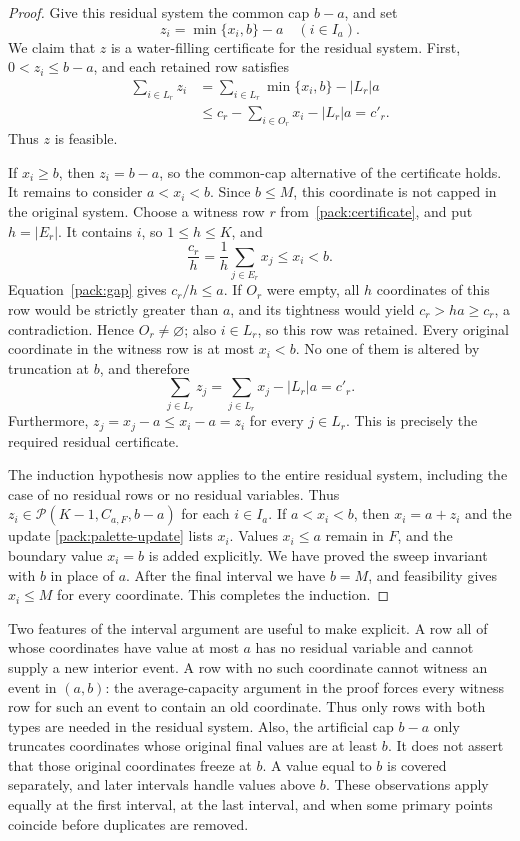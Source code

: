 \documentclass[11pt,a4paper]{article}
\theoremstyle{definition}
\theoremstyle{remark}
\begin{document}
\begin{proof}
Give this residual system the common cap $b-a$, and set
\begin{equation}\label{pack:residual-vector}
 z_i=\min\{x_i,b\}-a\quad(i\in I_a).
\end{equation}
We claim that $z$ is a water-filling certificate for the residual
system.  First, $0<z_i\leq b-a$, and each retained row satisfies
\begin{align*}
 \sum_{i\in L_r}z_i
 &=\sum_{i\in L_r}\min\{x_i,b\}-|L_r|a\\
 &\leq c_r-\sum_{i\in O_r}x_i-|L_r|a
 =c'_r.
\end{align*}
Thus $z$ is feasible.

If $x_i\geq b$, then $z_i=b-a$, so the common-cap alternative of
the certificate holds.  It remains to consider $a<x_i<b$.  Since
$b\leq M$, this coordinate is not capped in the original system.
Choose a witness row $r$ from~\eqref{pack:certificate}, and put
$h=|E_r|$.  It contains $i$, so $1\leq h\leq K$, and
\[
 \frac{c_r}{h}
 =\frac{1}{h}\sum_{j\in E_r}x_j
 \leq x_i<b.
\]
Equation~\eqref{pack:gap} gives $c_r/h\leq a$.
If $O_r$ were empty, all $h$ coordinates of this row would be strictly
greater than $a$, and its tightness would yield
$c_r>ha\geq c_r$, a contradiction.  Hence $O_r\ne\varnothing$;
also $i\in L_r$, so this row was retained.
Every original coordinate in the witness row is at most $x_i<b$.
No one of them is altered by truncation at $b$, and therefore
\[
 \sum_{j\in L_r}z_j
 =\sum_{j\in L_r}x_j-|L_r|a=c'_r.
\]
Furthermore, $z_j=x_j-a\leq x_i-a=z_i$ for every $j\in L_r$.
This is precisely the required residual certificate.

The induction hypothesis now applies to the entire residual system,
including the case of no residual rows or no residual variables.  Thus
$z_i\in\mathcal P(K-1,C_{a,F},b-a)$ for each $i\in I_a$.
If $a<x_i<b$, then $x_i=a+z_i$ and the update
\eqref{pack:palette-update} lists $x_i$.  Values $x_i\leq a$ remain in
$F$, and the boundary value $x_i=b$ is added explicitly.  We have proved
the sweep invariant with $b$ in place of $a$.  After the final interval
we have $b=M$, and feasibility gives $x_i\leq M$ for every coordinate.
This completes the induction.
\end{proof}

Two features of the interval argument are useful to make explicit.
A row all of whose coordinates have value at most $a$ has no residual
variable and cannot supply a new interior event.  A row with no such
coordinate cannot witness an event in $(a,b)$: the average-capacity
argument in the proof forces every witness row for such an event to
contain an old coordinate.  Thus only rows with both types are needed
in the residual system.  Also, the artificial cap $b-a$ only truncates
coordinates whose original final values are at least $b$.  It does not
assert that those original coordinates freeze at $b$.  A value equal to
$b$ is covered separately, and later intervals handle values above $b$.
These observations apply equally at the first interval, at the last
interval, and when some primary points coincide before duplicates are
removed.
\end{document}
